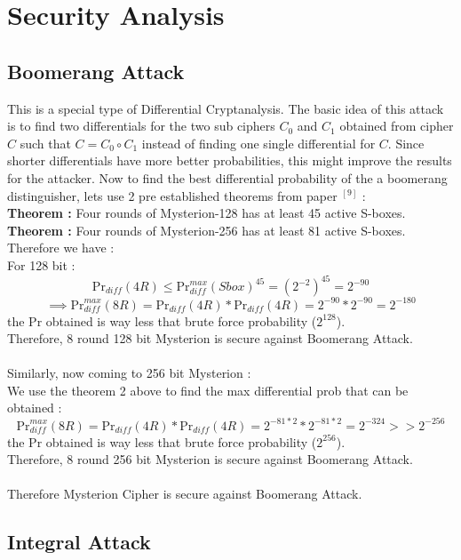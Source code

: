 \documentclass[preprint]{transcrypto}
\begin{document}
\section{Security Analysis}
\subsection{Boomerang Attack}
This is a special type of Differential Cryptanalysis. The basic idea of this attack is to find two differentials for the two sub ciphers $C_0$ and $C_1$ obtained from cipher $C$ such that $C=C_{0} \circ C_{1}$ instead of finding one single differential for $C$. Since shorter differentials have more better probabilities, this might improve the results for the attacker.
Now to find the best differential probability of the a boomerang distinguisher, lets use 2 pre established theorems from paper $^{[9]}$ : \\ \textbf{Theorem :}  Four rounds of Mysterion-128 has at least 45 active S-boxes.  \\
\textbf{Theorem :} Four rounds of Mysterion-256 has at least 81 active S-boxes. \\
Therefore we have :  \\
For 128 bit : \\
$$\text{Pr}_{diff}(4R) \leq \text{Pr}_{diff}^{max}(Sbox)^{45} = (2^{-2})^{45} = 2^{-90} $$
$$\implies \text{Pr}_{diff}^{max}(8R) = \text{Pr}_{diff}(4R) *\text{Pr}_{diff}(4R)  = 2^{-90}*2^{-90} = 2^{-180}  
$$
the Pr obtained is way less that  brute force probability ($2^{128}$). \\
Therefore, 8 round 128 bit Mysterion is secure against Boomerang Attack.  \\ \\
Similarly, now coming to 256 bit Mysterion : \\
We use the theorem 2 above to find the max differential prob that can be obtained : 
$$\text{Pr}_{diff}^{max}(8R) = \text{Pr}_{diff}(4R) *\text{Pr}_{diff}(4R)  = 2^{-81*2}*2^{-81*2} = 2^{-324} >> 2^{-256} 
$$
the Pr obtained is way less that  brute force probability ($2^{256}$). \\
Therefore, 8 round 256 bit Mysterion is secure against Boomerang Attack.  \\ \\
Therefore Mysterion Cipher is secure against Boomerang Attack.
\subsection{Integral Attack}
\end{document}
